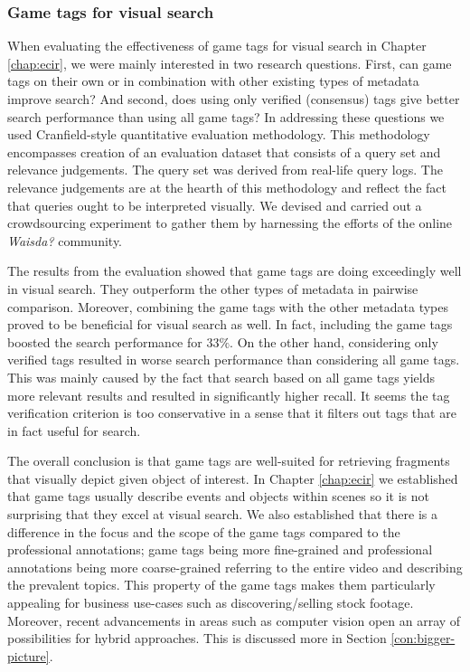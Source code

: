\subsubsection{Game tags for visual search}
When evaluating the effectiveness of game tags for visual search in Chapter \ref{chap:ecir}, we were mainly interested in two research questions. First, can game tags on their own or in combination with other existing types of metadata improve search? And second, does using only verified (consensus) tags give better search performance than using all game tags? In addressing these questions we used Cranfield-style quantitative evaluation methodology. This methodology encompasses creation of an evaluation dataset that consists of a query set and relevance judgements. The query set was derived from real-life query logs. The relevance judgements are at the hearth of this methodology and reflect the fact that queries ought to be interpreted visually. We devised and carried out a crowdsourcing experiment to gather them by harnessing the efforts of the online \textit{Waisda?} community.

The results from the evaluation showed that game tags are doing exceedingly well in visual search. They outperform  the other types of metadata in pairwise comparison. Moreover, combining the game tags with the other metadata types proved to be beneficial for visual search as well. In fact, including the game tags boosted the search performance for $33\%$. On the other hand, considering only verified tags resulted in worse search performance than considering all game tags. This was mainly caused by the fact that search based on all game tags yields more relevant results and resulted in significantly higher recall. It seems the tag verification criterion is too conservative in a sense that it filters out tags that are in fact useful for search.

The overall conclusion is that game tags are well-suited for retrieving fragments that visually depict given object of interest. In Chapter \ref{chap:ecir} we established that game tags usually describe events and objects within scenes so it is not surprising that they excel at visual search. We also established that there is a difference in the focus and the scope of the game tags compared to the professional annotations; game tags being more fine-grained and professional annotations being more coarse-grained referring to the entire video and describing the prevalent topics. This property of the game tags makes them particularly appealing for business use-cases such as discovering/selling stock footage. Moreover, recent advancements in areas such as computer vision open an array of possibilities for hybrid approaches. This is discussed more in Section \ref{con:bigger-picture}.

